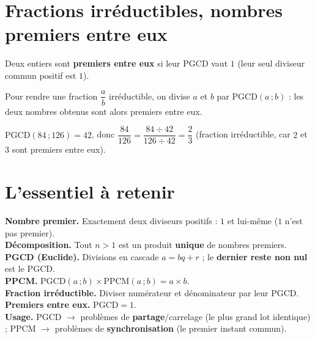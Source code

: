 \section{Fractions irréductibles, nombres premiers entre eux}

\begin{definition}
Deux entiers sont \textbf{premiers entre eux} si leur PGCD vaut $1$ (leur seul diviseur
commun positif est $1$).
\end{definition}

\begin{propriete}
Pour rendre une fraction $\dfrac ab$ irréductible, on divise $a$ et $b$ par
$\text{PGCD}(a\,;b)$ : les deux nombres obtenus sont alors premiers entre eux.
\end{propriete}

\begin{exemple}
$\text{PGCD}(84\,;126)=42$, donc $\dfrac{84}{126}=\dfrac{84\div42}{126\div42}=\dfrac23$
(fraction irréductible, car $2$ et $3$ sont premiers entre eux).
\end{exemple}

\section{L'essentiel à retenir}

\begin{synthese}
\textbf{Nombre premier.} Exactement deux diviseurs positifs : $1$ et lui-même ($1$ n'est
pas premier).\\[4pt]
\textbf{Décomposition.} Tout $n>1$ est un produit \textbf{unique} de nombres
premiers.\\[4pt]
\textbf{PGCD (Euclide).} Divisions en cascade $a=bq+r$ ; le \textbf{dernier reste non nul}
est le PGCD.\\[4pt]
\textbf{PPCM.} $\text{PGCD}(a\,;b)\times\text{PPCM}(a\,;b)=a\times b$.\\[4pt]
\textbf{Fraction irréductible.} Diviser numérateur et dénominateur par leur PGCD.\\[4pt]
\textbf{Premiers entre eux.} $\text{PGCD}=1$.\\[4pt]
\textbf{Usage.} PGCD $\to$ problèmes de \textbf{partage}/carrelage (le plus grand lot
identique) ; PPCM $\to$ problèmes de \textbf{synchronisation} (le premier instant commun).
\end{synthese}


